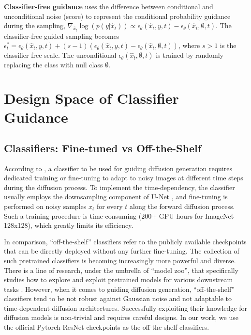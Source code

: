 \documentclass{article}
\theoremstyle{definition}
\begin{document}
\textbf{Classifier-free guidance} \citep{ho2022classifier} uses the difference between conditional and unconditional noise (score) to represent the conditional probability guidance during the sampling, $\nabla_{\hat{x}_t}\log(p(y|\hat{x}_t)) \propto \epsilon_{\theta}(\hat{x}_t,y,t) - \epsilon_{\theta}(\hat{x}_t,\emptyset,t) $. 
The classifier-free guided sampling becomes
$\epsilon_t^* = \epsilon_{\theta}(\hat{x}_t,y,t) + (s-1) (\epsilon_{\theta}(\hat{x}_t,y,t) - \epsilon_{\theta}(\hat{x}_t,\emptyset,t)) $, where $s>1$ is the classifier-free scale. The unconditional $\epsilon_{\theta}(\hat{x}_t,\emptyset,t)$ is trained by randomly replacing the class with null class $\emptyset$. 


\section{Design Space of Classifier Guidance}

\subsection{Classifiers: Fine-tuned vs Off-the-Shelf }
According to \cite{dhariwal2021diffusion}, a classifier to be used for guiding diffusion generation requires dedicated training or fine-tuning to adapt to noisy images at different time steps during the diffusion process. 
To implement the time-dependency, the classifier usually employs the downsampling component of U-Net \citep{ronneberger2015u}, and fine-tuning is performed on noisy samples $x_t$ for every $t$ along the forward diffusion process.
Such a training procedure is time-consuming (200+ GPU hours for ImageNet 128x128), which greatly limits its efficiency. 

In comparison, ``off-the-shelf'' classifiers refer to the publicly available checkpoints that can be directly deployed without any further fine-tuning. 
The collection of such pretrained classifiers is becoming increasingly more powerful and diverse. There is a line of research, under the umbrella of ``model zoo'', that specifically studies how to explore and exploit pretrained models for various downstream tasks \citep{shu2021zoo, dong2022zood, chen2023explore, luo2023diff}.  
However, when it comes to guiding diffusion generation, ``off-the-shelf'' classifiers tend to be not robust against Gaussian noise and not adaptable to time-dependent diffusion architectures. Successfully exploiting their knowledge for diffusion models is non-trivial and requires careful designs. 
In our work, we use the official Pytorch ResNet
checkpoints as the off-the-shelf classifiers. 
\end{document}
